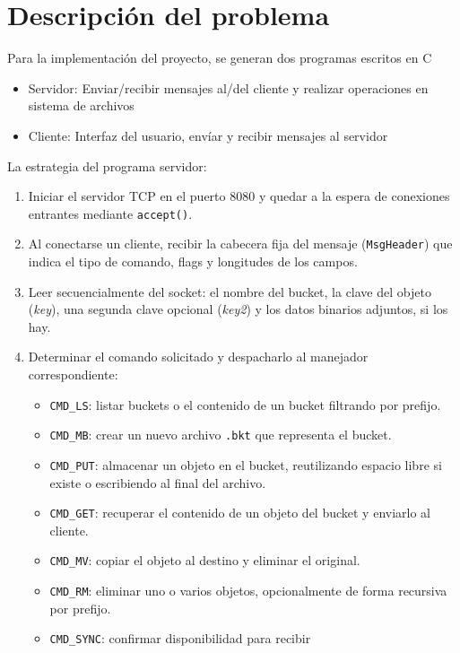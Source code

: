 \documentclass[12pt, letterpaper]{article}
\begin{document}
\section{Descripción del problema}
Para la implementación del proyecto, se generan dos programas escritos en C
\begin{itemize}
    \item Servidor: Enviar/recibir mensajes al/del cliente y realizar operaciones en sistema de archivos
    \item Cliente: Interfaz del usuario, envíar y recibir mensajes al servidor
\end{itemize}
La estrategia del programa servidor:
\begin{enumerate}
    \item Iniciar el servidor TCP en el puerto 8080 y quedar a la espera 
          de conexiones entrantes mediante \texttt{accept()}.
    \item Al conectarse un cliente, recibir la cabecera fija del mensaje 
          (\texttt{MsgHeader}) que indica el tipo de comando, flags y 
          longitudes de los campos.
    \item Leer secuencialmente del socket: el nombre del bucket, la clave 
          del objeto (\textit{key}), una segunda clave opcional (\textit{key2}) 
          y los datos binarios adjuntos, si los hay.
    \item Determinar el comando solicitado y despacharlo al manejador 
          correspondiente:
    \begin{itemize}
        \item \texttt{CMD\_LS}: listar buckets o el contenido de un bucket 
              filtrando por prefijo.
        \item \texttt{CMD\_MB}: crear un nuevo archivo \texttt{.bkt} que 
              representa el bucket.
        \item \texttt{CMD\_PUT}: almacenar un objeto en el bucket, 
              reutilizando espacio libre si existe o escribiendo al final 
              del archivo.
        \item \texttt{CMD\_GET}: recuperar el contenido de un objeto del 
              bucket y enviarlo al cliente.
        \item \texttt{CMD\_MV}: copiar el objeto al destino y eliminar el 
              original.
        \item \texttt{CMD\_RM}: eliminar uno o varios objetos, opcionalmente 
              de forma recursiva por prefijo.
        \item \texttt{CMD\_SYNC}: confirmar disponibilidad para recibir 

\end{itemize}
\end{enumerate}
\end{document}

